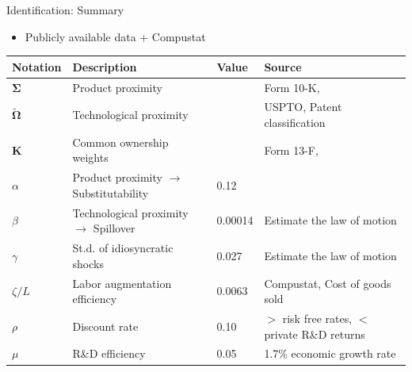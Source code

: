 \documentclass[
  10pt,               %
  aspectratio=169,    %
]{beamer}
\theoremstyle{plain}
\begin{document}
%
\begin{frame}{Identification: Summary}
  \begin{itemize}
    \item Publicly available data + Compustat
  \end{itemize}
  \begin{table}[h]
    \centering
      \small %
      \begin{tabular}{llll}
        \toprule
        Notation                           & Description                                      & Value   & Source                                   \\
        \midrule
        $\bm{\Sigma}$                   & Product proximity                                &         & Form 10-K, \citet{Hoberg2016-jm}          \\
        $\bm{\widetilde{\Omega}}$       & Technological proximity                          &         & USPTO, Patent classification             \\
        $\bm{K}$                        & Common ownership weights                         &         & Form 13-F, \citet{Backus2021-yt}          \\
        $\alpha$                           & Product proximity $\rightarrow$ Substitutability & 0.12    & \citet{Pellegrino2024-dn}                \\
        $\beta$                            & Technological proximity $\rightarrow$ Spillover  & 0.00014 & Estimate the law of motion               \\
        $\gamma$                           & St.d. of idiosyncratic shocks                    & 0.027   & Estimate the law of motion               \\
        $\zeta/L$                          & Labor augmentation efficiency                    & 0.0063  & Compustat, Cost of goods sold            \\
        $\rho$                             & Discount rate                                    & 0.10    & $>$ risk free rates, $<$ private R\&D returns \\
        $\mu$                              & R\&D efficiency                                  & 0.05    & 1.7\% economic growth rate               \\
        \bottomrule
      \end{tabular}
  \end{table}
\end{frame}
\end{document}
